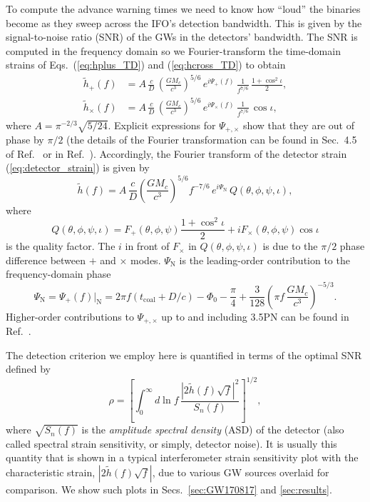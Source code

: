 \documentclass[prd,amsmath,amssymb,aps,floats,amsfonts,notitlepage,superscriptaddress,eqsecnum,nofootinbib,10pt]{revtex4-1}
\newcommand{\f}{\frac}
\newcommand{\be}{\begin{equation}}
\newcommand{\ee}{\end{equation}}
\begin{document}
To compute the advance warning times we need to know how ``loud'' the binaries become as they sweep across the IFO's detection bandwidth.
This is given by the signal-to-noise ratio (SNR) of the GWs in the detectors' bandwidth.
The SNR is computed in the frequency domain so we Fourier-transform the time-domain strains of Eqs.~(\ref{eq:hplus_TD}) and (\ref{eq:hcross_TD}) to obtain
%
\begin{align}
 \tilde{h}_+(f) &= A \, \f{c}{D}\, \left(\f{G M_c}{c^3}\right)^{5/6}\, e^{i \Psi_+(f)}\, \f{1}{f^{7/6}}\,  \f{1+\cos^2\iota}{2}  ,\label{eq:hplus_FD}\\
 \tilde{h}_\times(f) & = A \, \f{c}{D}\, \left(\f{G M_c}{c^3}\right)^{5/6}\, e^{i \Psi_\times(f)}\, \f{1}{f^{7/6}}\, \cos\iota \label{eq:hcross_FD},
\end{align}
%
%
where $A= \pi^{-2/3} \sqrt{5/24}$.
Explicit expressions for $\Psi_{+,\times}$ show that they are out of phase by $\pi/2$
(the details of the Fourier transformation can be found in Sec.~4.5 of Ref.~\cite{Maggiore} or in Ref.~\cite{Moore:2014lga}).
Accordingly, the Fourier transform of the detector strain (\ref{eq:detector_strain}) is given by
%
\be
\tilde{h}(f) = A\, \f{c}{D}\left(\f{G M_c}{c^3}\right)^{5/6} f^{-7/6}\, e^{i\Psi_\text{N}}\, Q(\theta,\phi,\psi,\iota), \label{eq:strain_FD}
\ee
%
where 
%
\be
Q(\theta,\phi,\psi,\iota) = F_+(\theta,\phi,\psi)\f{1+\cos^2\iota}{2}  + i F_\times(\theta,\phi,\psi) \cos\iota \label{eq:Q}
\ee
%
is the quality factor.
The $i$ in front of $F_\times$ in $Q(\theta,\phi,\psi,\iota)$ is due to the $\pi/2$ phase difference between $+$ and $\times$ modes.
$\Psi_\text{N}$ is the leading-order contribution to the frequency-domain phase
%
\be
\Psi_\text{N}=\Psi_+(f)|_\text{N} = 2\pi f (t_\text{coal}+D/c)-\Phi_0-\f{\pi}{4}+ \f{3}{128}\left(\pi f\,\f{G M_c}{c^3}\right)^{-5/3} \label{eq:phase_FD}.
\ee
%
%
Higher-order contributions to $\Psi_{+,\times}$ up to and including 3.5PN can be found in Ref.~\cite{SchutzLRR}.

The detection criterion we employ here is quantified in terms of the optimal SNR defined by
%
\be
\rho=\left[ \int_0^\infty d\ln f\, \f{|2\tilde{h}(f)\sqrt{f}|^2}{S_n(f)}\right]^{1/2} \label{eq:SNR},
\ee
%
where $\sqrt{S_n(f)}$ is the {\it amplitude spectral density} (ASD) of the detector (also called spectral strain sensitivity, or simply, detector noise).
It is usually this quantity that is shown in a typical interferometer strain sensitivity plot with the characteristic strain, $|2\tilde{h}(f)\sqrt{f}|$, 
due to various GW sources overlaid for comparison. 
%
We show such plots in Secs.~\ref{sec:GW170817} and \ref{sec:results}.
\end{document}
